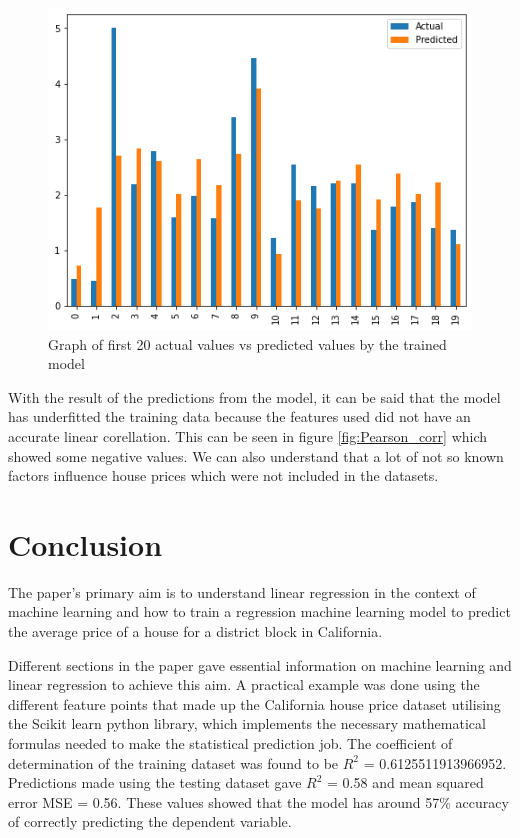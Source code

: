 \documentclass[conference]{IEEEtran}
\begin{document}
\begin{figure}[htbp]
	\centerline{\includegraphics [scale=0.5]{figures/actual_vs_predicted.png}}
	\caption{Graph of first 20 actual values vs predicted values by the trained model}
	\label{fig:actual_vs_predicted}
\end{figure}

With the result of the predictions from the model, it can be said that the model has underfitted the training data because the features used did not have an accurate linear corellation. This can be seen in figure \ref{fig:Pearson_corr} which showed some negative values. We can also understand that a lot of not so known factors influence house prices which were not included in the datasets.


\section{Conclusion}
The paper's primary aim is to understand linear regression in the context of machine learning and how to train a regression machine learning model to predict the average price of a house for a district block in California.

Different sections in the paper gave essential information on machine learning and linear regression to achieve this aim. A practical example was done using the different feature points that made up the California house price dataset utilising the Scikit learn python library, which implements the necessary mathematical formulas needed to make the statistical prediction job. The coefficient of determination of the training dataset was found to be $R^2$ = 0.6125511913966952. Predictions made  using the testing dataset gave $R^2$ = 0.58 and mean squared error MSE = 0.56. These values showed that the model has around 57\% accuracy of correctly predicting the dependent variable.
\end{document}
